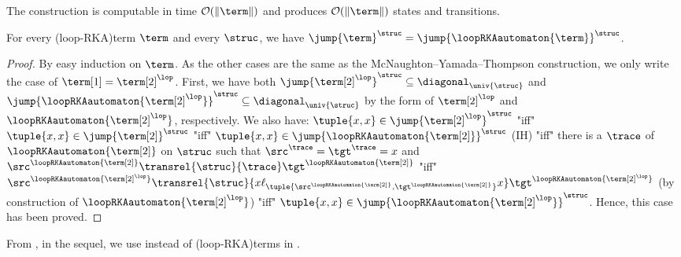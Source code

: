 The construction is computable in time $\mathcal{O}(\|\term\|)$ and produces
$\mathcal{O}(\|\term\|)$ states and transitions.

\begin{proposition}\label{prop: automata}
    For every \kl(loop-RKA){term} $\term$ and every  $\struc$,
    we have $\jump{\term}^{\struc} = \jump{\loopRKAautomaton{\term}}^{\struc}$.
\end{proposition}
\begin{proof}
    By easy induction on $\term$.
    As the other cases are the same as the McNaughton--Yamada--Thompson construction,
    we only write the case of $\term[1] = \term[2]^{\lop}$.
    First, we have both $\jump{\term[2]^{\lop}}^{\struc} \subseteq \diagonal_{\univ{\struc}}$ and $\jump{\loopRKAautomaton{\term[2]^{\lop}}}^{\struc} \subseteq \diagonal_{\univ{\struc}}$ by the form of $\term[2]^{\lop}$ and $\loopRKAautomaton{\term[2]^{\lop}}$, respectively.
    We also have:
    $\tuple{x, x} \in \jump{\term[2]^{\lop}}^{\struc}$ "iff"
    $\tuple{x, x} \in \jump{\term[2]}^{\struc}$ "iff"
    $\tuple{x, x} \in \jump{\loopRKAautomaton{\term[2]}}^{\struc}$ (IH) "iff"
    there is a  $\trace$ of $\loopRKAautomaton{\term[2]}$ on $\struc$ such that $\src^{\trace} = \tgt^{\trace} = x$
    and $\src^{\loopRKAautomaton{\term[2]}} \transrel{\struc}{\trace} \tgt^{\loopRKAautomaton{\term[2]}}$
    "iff"
    $\src^{\loopRKAautomaton{\term[2]^{\lop}}}
    \transrel{\struc}{x \ell_{\tuple{\src^{\loopRKAautomaton{\term[2]}}, \tgt^{\loopRKAautomaton{\term[2]}}}} x}
    \tgt^{\loopRKAautomaton{\term[2]^{\lop}}}$ (by construction of $\loopRKAautomaton{\term[2]^{\lop}}$) "iff"
    $\tuple{x, x} \in \jump{\loopRKAautomaton{\term[2]^{\lop}}}^{\struc}$.
    Hence, this case has been proved.
\end{proof}
From ,
in the sequel,
we use  instead of \kl(loop-RKA){terms} in .
%
